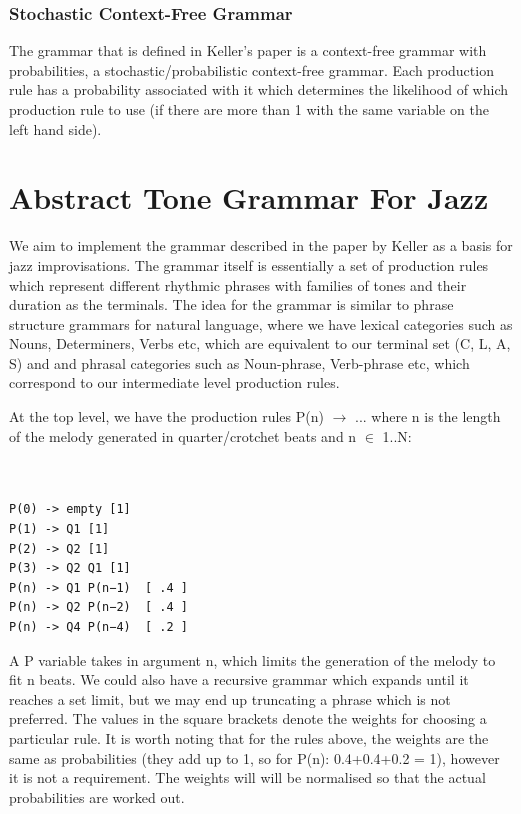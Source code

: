 \documentclass[pdftex,12pt,a4paper]{report}
\begin{document}
\subsubsection{Stochastic Context-Free Grammar}
The grammar that is defined in Keller's paper \cite{keller07} is a context-free grammar with probabilities, a stochastic/probabilistic context-free grammar. Each production rule has a probability associated with it which determines the likelihood of which production rule to use (if there are more than 1 with the same variable on the left hand side).

\section{Abstract Tone Grammar For Jazz}
We aim to implement the grammar described in the paper by Keller \cite{keller07} as a basis for jazz improvisations. The grammar itself is essentially a set of production rules which represent different rhythmic phrases with families of tones and their duration as the terminals. The idea for the grammar is similar to phrase structure grammars for natural language, where we have lexical categories such as Nouns, Determiners, Verbs etc, which are equivalent to our terminal set (C, L, A, S) and and phrasal categories such as Noun-phrase, Verb-phrase etc, which correspond to our intermediate level production rules.

At the top level, we have the production rules P(n) $\rightarrow$ ... where n is the length of the melody generated in quarter/crotchet beats and n $\in$ 1..N:

\begin{verbatim}


P(0) -> empty [1]
P(1) -> Q1 [1] 
P(2) -> Q2 [1] 
P(3) -> Q2 Q1 [1] 
P(n) -> Q1 P(n−1)  [ .4 ]
P(n) -> Q2 P(n−2)  [ .4 ] 
P(n) -> Q4 P(n−4)  [ .2 ]

\end{verbatim}

A P variable takes in argument n, which limits the generation of the melody to fit n beats. We could also have a recursive grammar which expands until it reaches a set limit, but we may end up truncating a phrase which is not preferred. The values in the square brackets denote the weights for choosing a particular rule. It is worth noting that for the rules above, the weights are the same as probabilities (they add up to 1, so for P(n):  0.4+0.4+0.2 = 1), however it is not a requirement. The weights will will be normalised so that the actual probabilities are worked out.
\end{document}
